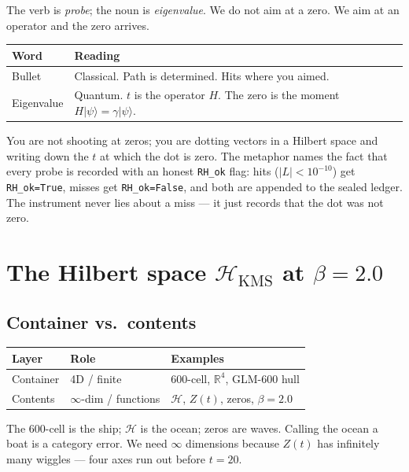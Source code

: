 \documentclass[11pt,letterpaper]{article}
\begin{document}
The verb is \emph{probe}; the noun is \emph{eigenvalue}. We do not aim at a
zero. We aim at an operator and the zero arrives.

\begin{center}
\begin{tabular}{ll}
\toprule
\textbf{Word} & \textbf{Reading} \\
\midrule
Bullet & Classical. Path is determined. Hits where you aimed. \\
Eigenvalue & Quantum. $t$ is the operator $H$. The zero is the moment $H|\psi\rangle = \gamma|\psi\rangle$. \\
\bottomrule
\end{tabular}
\end{center}

You are not shooting at zeros; you are dotting vectors in a Hilbert space
and writing down the $t$ at which the dot is zero. The metaphor names the
fact that every probe is recorded with an honest \texttt{RH\_ok} flag:
hits ($|L|<10^{-10}$) get \texttt{RH\_ok=True}, misses get \texttt{RH\_ok=False},
and both are appended to the sealed ledger. The instrument never lies about
a miss --- it just records that the dot was not zero.

\section{The Hilbert space $\mathcal{H}_{\mathrm{KMS}}$ at $\beta = 2.0$}
\label{sec:hilbert}

\subsection{Container vs.\ contents}

\begin{center}
\begin{tabular}{lll}
\toprule
\textbf{Layer} & \textbf{Role} & \textbf{Examples} \\
\midrule
Container & 4D / finite & 600-cell, $\mathbb{R}^4$, GLM-600 hull \\
Contents & $\infty$-dim / functions & $\mathcal{H}$, $Z(t)$, zeros, $\beta = 2.0$ \\
\bottomrule
\end{tabular}
\end{center}

The 600-cell is the ship; $\mathcal{H}$ is the ocean; zeros are waves.
Calling the ocean a boat is a category error. We need $\infty$ dimensions
because $Z(t)$ has infinitely many wiggles --- four axes run out before
$t = 20$.
\end{document}

